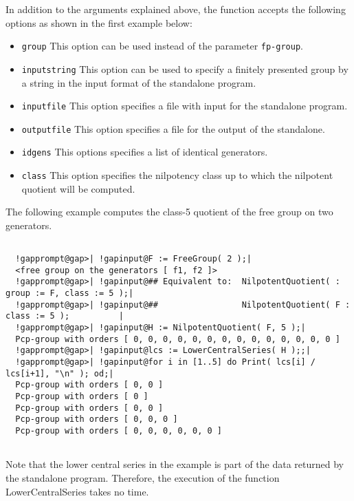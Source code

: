 \documentclass[a4paper,11pt]{report}
\begin{document}
{{{ In addition to the arguments explained above, the function accepts the
following options as shown in the first example below:  
\begin{itemize}
\item \texttt{group}  This option can be used instead of the parameter \texttt{fp-group}. 
\item \texttt{input\texttt{}{\textunderscore}string}  This option can be used to specify a finitely presented group by a string in
the input format of the standalone program. 
\item \texttt{input\texttt{}{\textunderscore}file}  This option specifies a file with input for the standalone program. 
\item \texttt{output\texttt{}{\textunderscore}file}  This option specifies a file for the output of the standalone. 
\item \texttt{idgens}  This options specifies a list of identical generators. 
\item \texttt{class}  This option specifies the nilpotency class up to which the nilpotent quotient
will be computed. 
\end{itemize}
 

The following example computes the class-5 quotient of the free group on two
generators. 
\begin{Verbatim}[commandchars=!@|,fontsize=\small,frame=single,label=Example]
  
  !gapprompt@gap>| !gapinput@F := FreeGroup( 2 );|
  <free group on the generators [ f1, f2 ]>
  !gapprompt@gap>| !gapinput@## Equivalent to:  NilpotentQuotient( : group := F, class := 5 );|
  !gapprompt@gap>| !gapinput@##                 NilpotentQuotient( F : class := 5 );          |
  !gapprompt@gap>| !gapinput@H := NilpotentQuotient( F, 5 );|
  Pcp-group with orders [ 0, 0, 0, 0, 0, 0, 0, 0, 0, 0, 0, 0, 0, 0 ]
  !gapprompt@gap>| !gapinput@lcs := LowerCentralSeries( H );;|
  !gapprompt@gap>| !gapinput@for i in [1..5] do Print( lcs[i] / lcs[i+1], "\n" ); od;|
  Pcp-group with orders [ 0, 0 ]
  Pcp-group with orders [ 0 ]
  Pcp-group with orders [ 0, 0 ]
  Pcp-group with orders [ 0, 0, 0 ]
  Pcp-group with orders [ 0, 0, 0, 0, 0, 0 ]
  
\end{Verbatim}
 Note that the lower central series in the example is part of the data returned
by the standalone program. Therefore, the execution of the function
LowerCentralSeries takes no time. 

}}}
\end{document}
